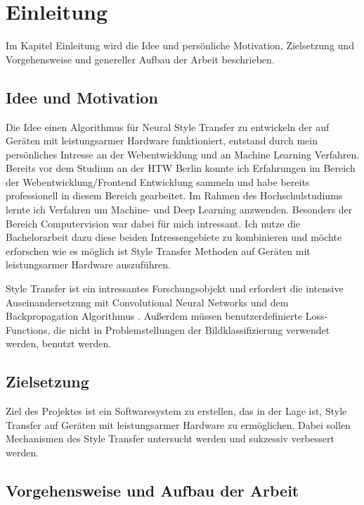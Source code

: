 \chapter{Einleitung}

Im Kapitel Einleitung wird die Idee und persönliche Motivation, Zielsetzung und Vorgehensweise und genereller Aufbau der Arbeit beschrieben.

\section{Idee und Motivation}

Die Idee einen Algorithmus für Neural Style Transfer zu entwickeln der auf Geräten mit leistungsarmer Hardware funktioniert, entstand durch mein persönliches 
Intresse an der Webentwicklung und an Machine Learning Verfahren. Bereits vor dem Studium an der HTW Berlin konnte ich Erfahrungen im Bereich der Webentwicklung/Frontend Entwicklung sammeln und habe bereits professionell in diesem Bereich gearbeitet. Im Rahmen des Hochschulstudiums lernte ich
Verfahren um Machine- und Deep Learning anzwenden. Besonders der Bereich Computervision war dabei für mich intressant. Ich nutze die Bachelorarbeit dazu diese beiden Intressengebiete zu kombinieren und möchte erforschen wie es möglich ist Style Transfer Methoden auf Geräten mit leistungsarmer Hardware auszuführen.

Style Transfer ist ein intressantes Forschungsobjekt und erfordert die intensive Auseinandersetzung mit Convolutional Neural Networks \cite{lecun-gradientbased-learning-applied-1998} und dem Backpropagation Algorithmus \cite{doi:10.1162/neco.1989.1.4.541}. Außerdem müssen benutzerdefinierte Loss-Functions, die nicht in Problemstellungen der Bildklassifizierung verwendet werden, benutzt werden.

\section{Zielsetzung}

Ziel des Projektes ist ein Softwaresystem zu erstellen, das in der Lage ist, Style Transfer auf Geräten mit leistungsarmer Hardware zu ermöglichen. Dabei sollen Mechanismen des Style Transfer untersucht werden und sukzessiv verbessert werden.

\section{Vorgehensweise und Aufbau der Arbeit}

